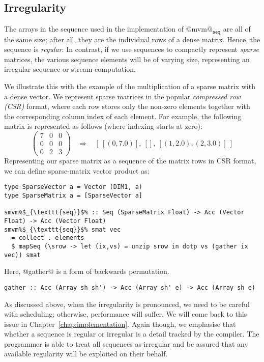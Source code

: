 \subsection{Irregularity}
\label{sec:irregularity}

The arrays in the sequence used in the implementation of @mvm@$_{\texttt{seq}}$ are all of the same size; after all, they are the individual rows of a dense matrix. Hence, the sequence is \emph{regular}. In contrast, if we use sequences to compactly represent \emph{sparse} matrices, the various sequence elements will be of varying size, representing an irregular sequence or stream computation.

We illustrate this with the example of the multiplication of a sparse matrix with a dense vector. We represent sparse matrices in the popular \emph{compressed row (CSR)} format, where each row stores only the non-zero elements together with the corresponding column index of each element. For example, the following matrix is represented as follows (where indexing starts at zero):
%
\[
\left(
\begin{array}{ccc}
  7 & 0 & 0 \\
  0 & 0 & 0 \\
  0 & 2 & 3
\end{array} \right)
~~~~ \Rightarrow
~~~~ [~[(0,7.0)],~[],~[(1,2.0),(2,3.0)]~]
\]
%
Representing our sparse matrix as a sequence of the matrix rows in CSR format,
we can define sparse-matrix vector product as:
%
\begin{lstlisting}
type SparseVector a = Vector (DIM1, a)
type SparseMatrix a = [SparseVector a]

smvm%$_{\texttt{seq}}$% :: Seq (SparseMatrix Float) -> Acc (Vector Float) -> Acc (Vector Float)
smvm%$_{\texttt{seq}}$% smat vec
  = collect . elements
  $ mapSeq (\srow -> let (ix,vs) = unzip srow in dotp vs (gather ix vec)) smat
\end{lstlisting}
%
Here, @gather@ is a form of backwards permutation.
%
\begin{lstlisting}
gather :: Acc (Array sh sh') -> Acc (Array sh' e) -> Acc (Array sh e)
\end{lstlisting}

As discussed above, when the irregularity is pronounced, we need to be careful with scheduling; otherwise, performance will suffer. We will come back to this issue in Chapter~\ref{chap:implementation}. Again though, we emphasise that whether a sequence is regular or irregular is a detail tracked by  the compiler. The programmer is able to treat all sequences as irregular and be assured that any available regularity will be exploited on their behalf.

